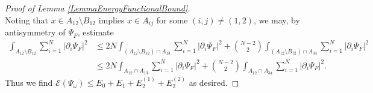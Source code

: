 \documentclass[a4paper,11pt]{article}
\newcommand{\norm}[1]{\left\lVert #1 \right\rVert}
\newcommand{\abs}[1]{\left\lvert #1 \right\rvert}
\newcommand{\R}{\mathbb{R}}
\newcommand{\rr}{\mathcal{R}}
\numberwithin{equation}{section}
\begin{document}
\begin{proof}[Proof of Lemma \ref{LemmaEnergyFunctionalBound}]
\begin{equation}
		\end{equation}	
		Noting that $x\in A_{12}\setminus B_{12}$ implies $x\in A_{ij}$ for some $(i,j)\neq (1,2)$, we may, by antisymmetry of $\Psi_F$, estimate\begin{equation}
			\begin{aligned}
				\int_{A_{12}\setminus B_{12}}\sum_{i=1}^{N}\abs{\partial_i\Psi_F}^2&\leq 2N\int_{(A_{12}\setminus B_{12})\cap A_{13}}\sum_{i=1}^{N}\abs{\partial_i\Psi_F}^2+\binom{N-2}{2}\int_{(A_{12}\setminus B_{12})\cap A_{34}}\sum_{i=1}^{N}\abs{\partial_i\Psi_F}^2\\
				&\leq 2N\int_{A_{12}\cap A_{13}}\sum_{i=1}^{N}\abs{\partial_i\Psi_F}^2+\binom{N-2}{2}\int_{A_{12}\cap A_{34}}\sum_{i=1}^{N}\abs{\partial_i\Psi_F}^2.
			\end{aligned}
		\end{equation}
		Thus we find $
		\mathcal{E}(\Psi_\omega)\leq E_0+E_1+E_2^{(1)}+E_2^{(2)}$ as desired.
	\end{proof}
\end{document}
